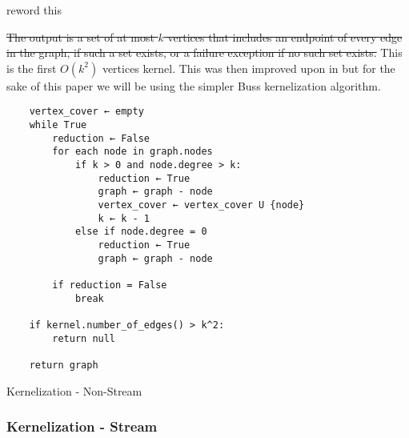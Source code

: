 reword this

\sout{The output is a set of at most \(k\) vertices that includes an endpoint
    of every edge in the graph, if such a set exists, or a failure exception if
    no such set exists.} This is the first \(O(k^2)\) vertices kernel. This was
then improved upon in \cite{balasubramanian1998improved} but for the sake
of this paper we will be using the simpler Buss kernelization algorithm.

\begin{verbatim}
    vertex_cover ← empty
    while True
        reduction ← False
        for each node in graph.nodes
            if k > 0 and node.degree > k:
                reduction ← True
                graph ← graph - node
                vertex_cover ← vertex_cover U {node}
                k ← k - 1
            else if node.degree = 0
                reduction ← True
                graph ← graph - node

        if reduction = False
            break

    if kernel.number_of_edges() > k^2:
        return null

    return graph
\end{verbatim}

\begin{algorithm}[H]
    \caption{Kernelization - Non-Stream}
    \DontPrintSemicolon {}
     

       
\end{algorithm}

\subsubsection{Kernelization - Stream}

